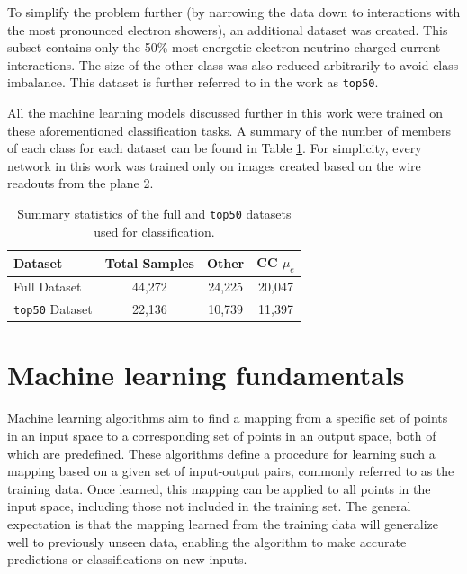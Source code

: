 \documentclass{pracalicmgr}
\begin{document}
To simplify the problem further (by narrowing the data down to interactions with the most pronounced electron showers), an additional dataset was created. This subset contains only the 50\% most energetic electron neutrino charged current interactions. The size of the other class was also reduced arbitrarily to avoid class imbalance. This dataset is further referred to in the work as \texttt{top50}.

All the machine learning models discussed further in this work were trained on these aforementioned classification tasks. A summary of the number of members of each class for each dataset can be found in Table \ref{tab:dataset_stats}. For simplicity, every network in this work was trained only on images created based on the wire readouts from the plane 2.

\begin{table}[h]
    \centering
    \caption{Summary statistics of the full and \texttt{top50} datasets used for classification.}
    \label{tab:dataset_stats}
    \begin{tabular}{lccc}
        \toprule
        \textbf{Dataset} & \textbf{Total Samples} & \textbf{Other} & \textbf{CC $\mu_e$ } \\
        \midrule
        Full Dataset     & 44,272                 & 24,225 & 20,047 \\
        \texttt{top50} Dataset & 22,136                 & 10,739 & 11,397 \\
        \bottomrule
    \end{tabular}
\end{table}

\chapter{Machine learning fundamentals}

Machine learning algorithms aim to find a mapping from a specific set of points in an input space to a corresponding set of points in an output space, both of which are predefined. These algorithms define a procedure for learning such a mapping based on a given set of input-output pairs, commonly referred to as the training data. Once learned, this mapping can be applied to all points in the input space, including those not included in the training set. The general expectation is that the mapping learned from the training data will generalize well to previously unseen data, enabling the algorithm to make accurate predictions or classifications on new inputs.
\end{document}
